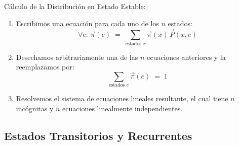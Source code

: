 \documentclass[ 10pt, xcolor = dvipsnames]{beamer}
\begin{document}
\begin{frame}[allowframebreaks]
\frametitle{\insertsubsection}

C\'alculo de la Distribuci\'on en Estado Estable: 
\begin{enumerate}
\item Escribimos una ecuaci\'on para cada uno de los $n$ estados: 
\[
\forall e \colon \, \vec{\pi}(e) \; = \; 
\sum_{\text{estados }x} \vec{\pi}(x) \, \vec{P}(x,e) 
\]
\item Desechamos arbitrariamente una de las $n$ ecuaciones anteriores y la reemplazamos por: 
\[
\sum_{\text{estados }e} \vec{\pi}(e) \; = \; 1
\]
\item Resolvemos el sistema de ecuaciones lineales resultante, el cual tiene \linebreak $n$ inc\'ognitas y $n$ ecuaciones linealmente independientes. 

\end{enumerate}

\end{frame}

\subsection{Estados Transitorios y Recurrentes}
\end{document}
